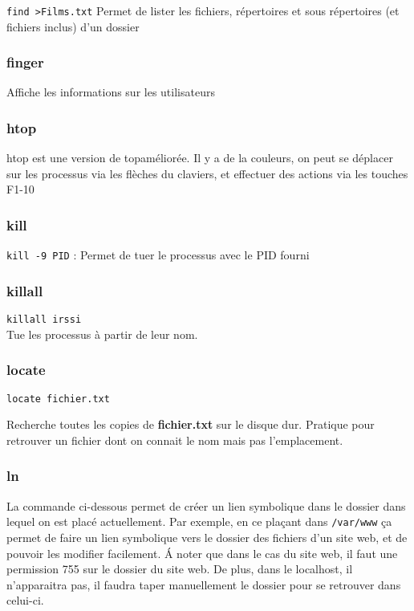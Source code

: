 \documentclass[a4paper,twoside]{article}
\begin{document}
\verb|find >Films.txt|
Permet de lister les fichiers, répertoires et sous répertoires (et fichiers inclus) d'un dossier

\subsubsection{finger}
Affiche les informations sur les utilisateurs

\subsubsection{htop}\label{sec:htop}
htop est une version de \og top\fg améliorée. Il y a de la couleurs, on peut se déplacer sur les processus via les flèches du claviers, et effectuer des actions via les touches \og F1-10\fg

\subsubsection{kill}
\verb|kill -9 PID| : Permet de tuer le processus avec le PID fourni

\subsubsection{killall}
\verb|killall irssi|\\
Tue les processus à partir de leur nom.

\subsubsection{locate}
\verb|locate fichier.txt|

Recherche toutes les copies de \textbf{fichier.txt} sur le disque dur. Pratique pour retrouver un fichier dont on connait le nom mais pas l'emplacement.

\subsubsection{ln}
La commande ci-dessous permet de créer un lien symbolique dans le dossier dans lequel on est placé actuellement. Par exemple, en ce plaçant dans \verb|/var/www| ça permet de faire un lien symbolique vers le dossier des fichiers d'un site web, et de pouvoir les modifier facilement. \'A noter que dans le cas du site web, il faut une permission 755 sur le dossier du site web. De plus, dans le localhost, il n'apparaitra pas, il faudra taper manuellement le dossier pour se retrouver dans celui-ci.
\end{document}
